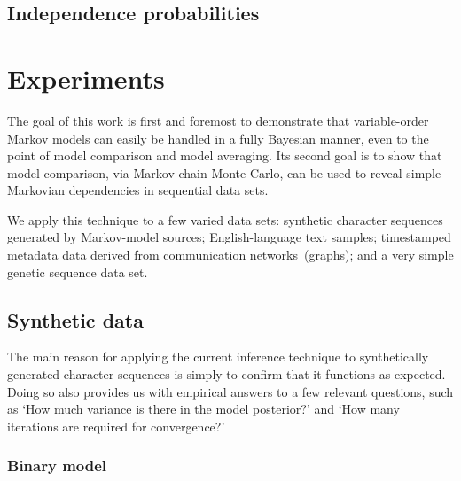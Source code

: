 \documentclass[12pt,a4paper]{article}
\begin{document}
\subsection{Independence probabilities} %

\section{Experiments} %

The goal of this work is first and foremost to demonstrate that variable-order
Markov models can easily be handled in a fully Bayesian manner, even to the
point of model comparison and model averaging. Its second goal is to show that
model comparison, via Markov chain Monte Carlo, can be used to reveal simple
Markovian dependencies in sequential data sets.

We apply this technique to a few varied data sets: synthetic character sequences
generated by Markov-model sources; English-language text samples; timestamped
metadata data derived from communication networks~(graphs); and a very simple
genetic sequence data set.

\subsection{Synthetic data}\label{sec:synthetic} %

The main reason for applying the current inference technique to synthetically
generated character sequences is simply to confirm that it functions as
expected. Doing so also provides us with empirical answers to a few relevant
questions, such as `How much variance is there in the model posterior?' and `How
many iterations are required for convergence?'

\subsubsection{Binary model} %
\end{document}
